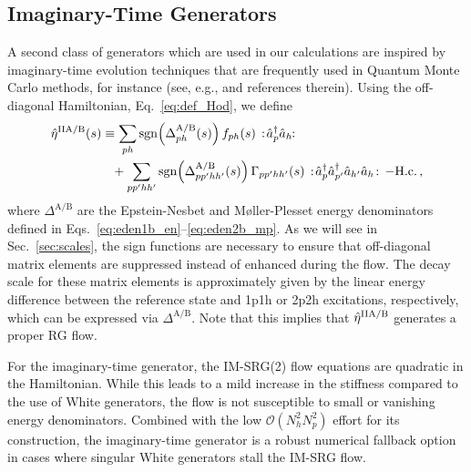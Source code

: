 \subsection{\label{sec:generators_ImTime}Imaginary-Time Generators}
A second class of generators which are used in our calculations are inspired by imaginary-time evolution techniques that are frequently used in Quantum Monte Carlo methods, for instance (see, e.g., \cite{Carlson:2015lq} and references therein). Using the off-diagonal Hamiltonian, Eq.~\eqref{eq:def_Hod}, we define
\begin{align}
  \etaO^\text{IIA/B}(s)
  &\equiv\sum_{ph} \mathrm{sgn}\!\left(\Delta^\text{A/B}_{ph}(s)\right)f_{ph}(s)\nord{\aaO_{p}\aO_{h}\!}\notag\\
  &\hphantom{=}
   +\sum_{pp'hh'}\mathrm{sgn}\!\left(\Delta^\text{A/B}_{pp'hh'}(s)\right)\Gamma_{pp'hh'}(s)\nord{\aaO_{p}\aaO_{p'}\aO_{h'}\aO_{h}}-\text{H.c.}\,,\label{eq:eta_imtime}
\end{align}
where $\Delta^\text{A/B}$ are the Epstein-Nesbet and M{\o}ller-Plesset energy denominators defined in Eqs.~\eqref{eq:eden1b_en}--\eqref{eq:eden2b_mp}. As we will see in Sec.~\ref{sec:scales}, the sign functions are necessary to ensure that off-diagonal matrix elements are suppressed instead of enhanced during the flow. The decay scale for these matrix elements is approximately given by the linear energy difference between the reference state and 1p1h or 2p2h excitations, respectively, which can be expressed via $\Delta^\text{A/B}$. Note that this implies that $\hat{\eta}^\text{IIA/B}$ generates a proper RG flow.

For the imaginary-time generator, the IM-SRG(2) flow equations are quadratic in the Hamiltonian. While this leads to a mild increase in the stiffness compared to the use of White generators, the flow is not susceptible to small or vanishing energy denominators. Combined with the low $\mathcal{O}(N_h^2N_p^2)$ effort for its construction, the imaginary-time generator is a robust numerical fallback option in cases where singular White generators stall the IM-SRG flow.


